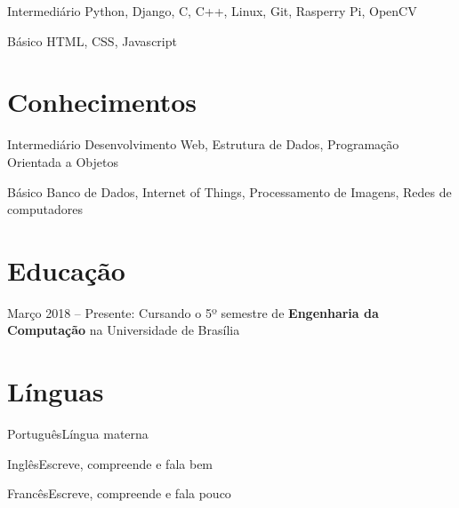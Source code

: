 \documentclass{tccv_full}
\begin{document}
\begin{factlist}

\item{Intermediário}
     {Python, Django, C, C++, Linux, Git, Rasperry Pi, OpenCV}

\item{Básico}
     {HTML, CSS, Javascript}



\end{factlist}

\section{Conhecimentos}

\begin{factlist}

\item{Intermediário}
     {Desenvolvimento Web, Estrutura de Dados, Programação Orientada a Objetos}

\item{Básico}
     {Banco de Dados, Internet of Things, Processamento de Imagens, Redes de computadores}

\end{factlist}

\section{Educação}

	{Março 2018 -- Presente}: Cursando o 5º semestre de  \textbf{Engenharia da Computação} na Universidade de Brasília

\section{Línguas}

\begin{factlist}
\item{Português}{Língua materna}
\item{Inglês}{Escreve, compreende e fala bem}
\item{Francês}{Escreve, compreende e fala pouco}
\end{factlist}
\end{document}
